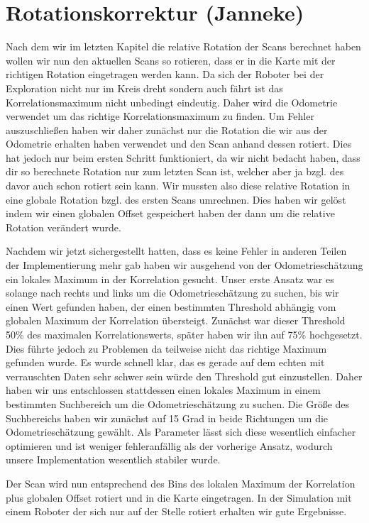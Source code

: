 \section{Rotationskorrektur (Janneke)}

Nach dem wir im letzten Kapitel die relative Rotation der Scans berechnet haben wollen wir nun den aktuellen Scans so rotieren, dass er in die Karte mit der richtigen Rotation eingetragen werden kann. Da sich der Roboter bei der Exploration nicht nur im Kreis dreht sondern auch fährt ist das Korrelationsmaximum nicht unbedingt eindeutig. Daher wird die Odometrie verwendet um das richtige Korrelationsmaximum zu finden. Um Fehler auszuschließen haben wir daher zunächst nur die Rotation die wir aus der Odometrie erhalten haben verwendet und den Scan anhand dessen rotiert. Dies hat jedoch nur beim ersten Schritt funktioniert, da wir nicht bedacht haben, dass dir so berechnete Rotation nur zum letzten Scan ist, welcher aber ja bzgl. des davor auch schon rotiert sein kann. Wir mussten also diese relative Rotation in eine globale Rotation bzgl. des ersten Scans umrechnen. Dies haben wir gelöst indem wir einen globalen Offset gespeichert haben der dann um die relative Rotation verändert wurde.

Nachdem wir jetzt sichergestellt hatten, dass es keine Fehler in anderen Teilen der Implementierung mehr gab haben wir ausgehend von der Odometrieschätzung ein lokales Maximum in der Korrelation gesucht. Unser erste Ansatz war es solange nach rechts und links um die Odometrieschätzung zu suchen, bis wir einen Wert gefunden haben, der einen bestimmten Threshold abhängig vom globalen Maximum der Korrelation übersteigt. Zunächst war dieser Threshold 50\% des maximalen Korrelationswerts, später haben wir ihn auf 75\% hochgesetzt. Dies führte jedoch zu Problemen da teilweise nicht das richtige Maximum gefunden wurde. Es wurde schnell klar, das es gerade auf dem echten mit verrauschten Daten sehr schwer sein würde den Threshold gut einzustellen. Daher haben wir uns entschlossen stattdessen einen lokales Maximum in einem bestimmten Suchbereich um die Odometrieschätzung zu suchen. Die Größe des Suchbereichs haben wir zunächst auf 15 Grad in beide Richtungen um die Odometrieschätzung gewählt. Als Parameter lässt sich diese wesentlich einfacher optimieren und ist weniger fehleranfällig als der vorherige Ansatz, wodurch unsere Implementation wesentlich stabiler wurde.

Der Scan wird nun entsprechend des Bins des lokalen Maximum der Korrelation plus globalen Offset rotiert und in die Karte eingetragen. In der Simulation mit einem Roboter der sich nur auf der Stelle rotiert erhalten wir gute Ergebnisse. 